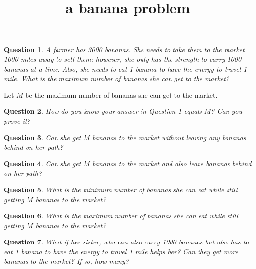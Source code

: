 \documentclass[12pt]{article}
\title{a banana problem}
\theoremstyle{plain}
\newtheorem{QQ}{Question}
\begin{document}
\maketitle

\begin{QQ}
A farmer has 3000 bananas. She needs to take them to the market 1000 miles away to sell them;
however, she only has the strength to carry 1000 bananas at a time. Also, she needs to eat 1 banana
to have the energy to travel 1 mile. What is the maximum number of bananas she can get to the
market?
\end{QQ}

Let $M$ be the maximum number of bananas she can get to the market.

\begin{QQ}
How do you know your answer in Question 1 equals $M$? Can you prove it?
\end{QQ}

\begin{QQ}
Can she get $M$ bananas to the market without leaving any bananas behind on her path?
\end{QQ}

\begin{QQ}
Can she get $M$ bananas to the market and also leave bananas behind on her path?
\end{QQ}

\begin{QQ}
What is the minimum number of bananas she can eat while still getting $M$ bananas to the market?
\end{QQ}

\begin{QQ}
What is the maximum number of bananas she can eat while still getting $M$ bananas to the market?
\end{QQ}

\begin{QQ}
What if her sister, who can also carry 1000 bananas but also has to eat 1 banana
to have the energy to travel 1 mile helps her?  Can they get more bananas to the market?  If so, how many?
\end{QQ}
\end{document}
